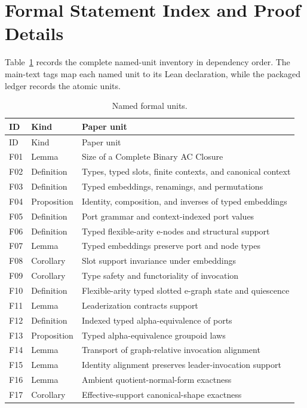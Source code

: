 \section{Formal Statement Index and Proof Details}
\label{app:formal-details}

Table~\ref{tab:formal-index} records the complete named-unit inventory in
dependency order.  The main-text tags map each named unit to its Lean
declaration, while the packaged ledger records the atomic units.

\begin{longtable}{@{}p{0.8cm}p{2.0cm}p{7.7cm}@{}}
\caption{Named formal units.}\label{tab:formal-index}\\
\toprule
ID & Kind & Paper unit\\
\midrule
\endfirsthead
\toprule ID & Kind & Paper unit\\ \midrule
\endhead
F01 & Lemma & Size of a Complete Binary AC Closure\\
F02 & Definition & Types, typed slots, finite contexts, and canonical context\\
F03 & Definition & Typed embeddings, renamings, and permutations\\
F04 & Proposition & Identity, composition, and inverses of typed embeddings\\
F05 & Definition & Port grammar and context-indexed port values\\
F06 & Definition & Typed flexible-arity e-nodes and structural support\\
F07 & Lemma & Typed embeddings preserve port and node types\\
F08 & Corollary & Slot support invariance under embeddings\\
F09 & Corollary & Type safety and functoriality of invocation\\
F10 & Definition & Flexible-arity typed slotted e-graph state and quiescence\\
F11 & Lemma & Leaderization contracts support\\
F12 & Definition & Indexed typed alpha-equivalence of ports\\
F13 & Proposition & Typed alpha-equivalence groupoid laws\\
F14 & Lemma & Transport of graph-relative invocation alignment\\
F15 & Lemma & Identity alignment preserves leader-invocation support\\
F16 & Lemma & Ambient quotient-normal-form exactness\\
F17 & Corollary & Effective-support canonical-shape exactness\\

\end{longtable}
